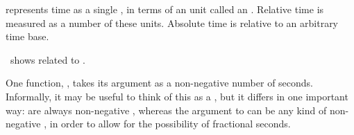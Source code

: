 
\endsubsubsection%


 represents time as a single ,
in terms of an  unit called an .
Relative time is measured as a number of these units.
Absolute time is relative to an arbitrary time base.

\Thenextfigure\ shows  related to .


\endsubsubsection%


One function, , takes its argument as a non-negative  number
of seconds.  Informally, it may be useful to think of this as 
a  , but it differs in one important way:
 are always non-negative , whereas the argument to
 can be any kind of non-negative , in order to allow for
the possibility of fractional seconds.


\endsubsubsection%

\endsubsection%

